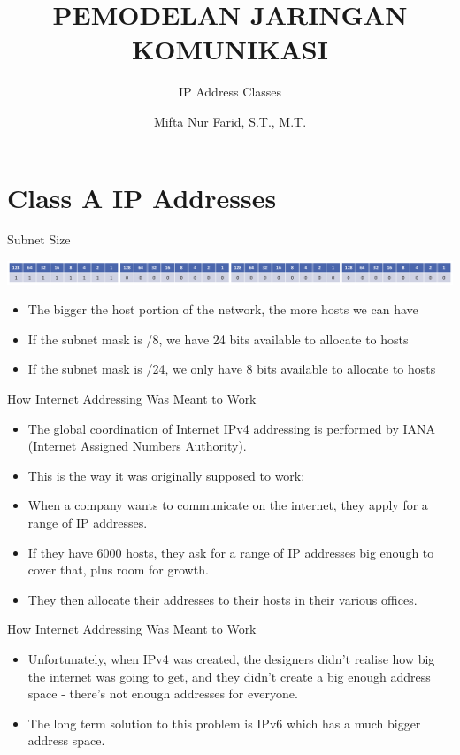 \documentclass[pdflatex,compress]{beamer}
\title{PEMODELAN JARINGAN KOMUNIKASI}
\subtitle{IP Address Classes}
\author{Mifta Nur Farid, S.T., M.T.}
\begin{document}
\maketitle

\section{Class A IP Addresses}

\begin{frame}{Subnet Size}
	\begin{center}
		\includegraphics[width=1\linewidth]{img/img01}
	\end{center}
	\begin{itemize}
		\item The bigger the host portion of the network, the more hosts we can have
		\item If the subnet mask is /8, we have 24 bits available to allocate to hosts
		\item If the subnet mask is /24, we only have 8 bits available to allocate to hosts
	\end{itemize}
\end{frame}

\begin{frame}{How Internet Addressing Was Meant to Work}
	\begin{itemize}
		\item The global coordination of Internet IPv4 addressing is performed by IANA (Internet Assigned Numbers Authority).
		\item This is the way it was originally supposed to work:
		\item When a company wants to communicate on the internet, they apply for a range of IP addresses.
		\item If they have 6000 hosts, they ask for a range of IP addresses big enough to cover that, plus room for growth.
		\item They then allocate their addresses to their hosts in their various offices.
	\end{itemize}
\end{frame}

\begin{frame}{How Internet Addressing Was Meant to Work}
	\begin{itemize}
		\item Unfortunately, when IPv4 was created, the designers didn't realise how big the internet was going to get, and they didn't create a big enough address space - there's not enough addresses for everyone.
		\item The long term solution to this problem is IPv6 which has a much bigger address space.
	\end{itemize}
\end{frame}
\end{document}
